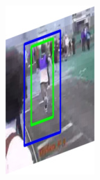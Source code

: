 \documentclass{report}
\begin{document}
\begin{figure}[h]
\begin{subfigure}{0.15\textwidth}
    \includegraphics[width=\textwidth]{output/img_5.jpg}
  \end{subfigure}
  \begin{subfigure}{0.15\textwidth}

\end{subfigure}
\end{figure}
\end{document}
